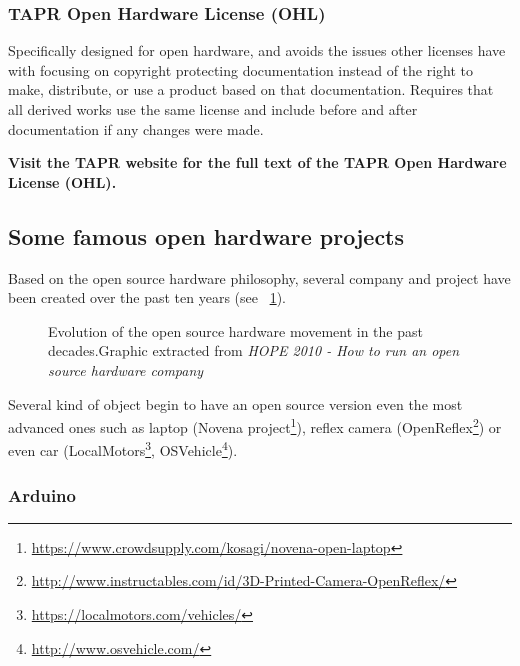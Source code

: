 \subsubsection{TAPR Open Hardware License (OHL)}
Specifically designed for open hardware, and avoids the issues other licenses have with focusing on copyright protecting documentation instead of the right to make, distribute, or use a product based on that documentation. Requires that all derived works use the same license and include before and after documentation if any changes were made.

\textbf{Visit the TAPR website for the full text of the TAPR Open Hardware License (OHL).}


\subsection{Some famous open hardware projects} %

Based on the open source hardware philosophy, several company and project have been created over the past ten years (see \figurename~\ref{fig:oh_evolution}).

\begin{figure}[h]
\centering
    \hfil
    \caption{Evolution of the open source hardware movement in the past decades.Graphic extracted from \emph{HOPE 2010 - How to run an open source hardware company}}
    \label{fig:oh_evolution}
\end{figure}


Several kind of object begin to have an open source version even the most advanced ones such as laptop (Novena project\footnote{\url{https://www.crowdsupply.com/kosagi/novena-open-laptop}}), reflex camera (OpenReflex\footnote{\url{http://www.instructables.com/id/3D-Printed-Camera-OpenReflex/}}) or even car (LocalMotors\footnote{\url{https://localmotors.com/vehicles/}}, OSVehicle\footnote{\url{http://www.osvehicle.com/}}).


\subsubsection{Arduino} %

